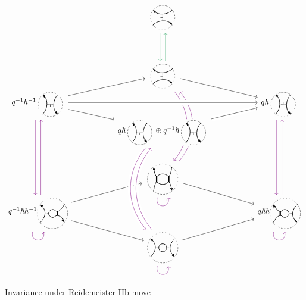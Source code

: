 \documentclass{article}
\DeclareMathOperator{\Res}{Res}
\theoremstyle{plain} %
\theoremstyle{definition} %
\theoremstyle{remark} %
\begin{document}
\begin{figure}
	\centering
	\[\label{r2bsdr}
	\begin{tikzcd}[row sep=-0.1cm, column sep=2cm]
		&
		\scalebox{0.7}{\UnorientedVerticalThinEdge{}{}{}{}{-}}
		\arrow[d, color=ForestGreen, shift right=1.5]
		&
		\\[4em]&
		\scalebox{0.7}{\UnorientedVerticalThinEdge{}{}{}{}{-}}
		\arrow[dr]
		\arrow[ddd, bend left=40, color=violet, shift right=1.5, dash pattern=on 40pt off 35pt]
		\arrow[leftarrow, ddd, bend left=40, color=violet, shift left=1.5, dash pattern=on 39.5pt off 37pt]
		\arrow[u, color=ForestGreen, shift right=1.5]
		&
		\\
		q^{-1} h^{-1}\scalebox{0.7}{\UnorientedHorizontalThinEdge{}{}{}{}{-}} 
		\arrow[dr]
		\arrow[ur]
		\arrow[ddd, color=violet, shift right=1.5]
		&
		&
		q h\scalebox{0.7}{\UnorientedHorizontalThinEdge{}{}{}{}{+}}
		\arrow[ddd, color=violet, shift right=1.5]
		\\
		& 
		q\hslash \scalebox{0.7}{\UnorientedHorizontalThinEdge{}{}{}{}{-}}\oplus q^{-1}\hslash \scalebox{0.7}{\UnorientedHorizontalThinEdge{}{}{}{}{-}}
		\arrow[ur, crossing over] 
		&
		\\[2em]
		& 
		\scalebox{0.7}{\Square{}{}{}{}{}{}}
		\arrow[loop right, distance=1.5em, in=-75, out=-105, color=violet]
		\arrow[dr]
		&
		\\
		q^{-1}\hslash h^{-1}\scalebox{0.7}{\ThinThickUnoriented{}{}{}{}{}} 
		\arrow[loop right, distance=1.5em, in=-75, out=-105, color=violet]
		\arrow[ur]
		\arrow[dr]
		\arrow[uuu, color=violet, shift right=1.5]
		&& 
		q\hslash h\scalebox{0.7}{\ThickThinUnoriented{}{}{}{}{}}
		\arrow[uuu, color=violet, shift right=1.5]
		\arrow[loop right, distance=1.5em, in=-75, out=-105, color=violet]
		\\
		& 
		\scalebox{0.7}{\ThinThinUnoriented{}{}{}{}{}} 
		\arrow[ur]
		\arrow[loop right, distance=1.5em, in=-75, out=-105, color=violet] 
		&
		\arrow[ddd, from=4-2, to=7-2, bend right=40, crossing over, color=violet, shift right=1.5] 
		\arrow[uuu, from=7-2, to=4-2, bend left=40, crossing over, color=violet, shift right=1.5] 
		\arrow[ur, from=4-2, to=3-3, crossing over] 
		\arrow[rr, from=3-1, to=3-3, crossing over] 
	\end{tikzcd}
	\]
	\caption{Invariance under Reidemeister IIb move}
\end{figure}





\end{document}
